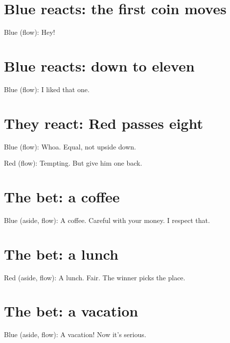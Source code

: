 
\section{Blue reacts: the first coin moves}\label{react:first-move}

Blue (flow): Hey!


\section{Blue reacts: down to eleven}\label{react:blue-reaches-eleven}

Blue (flow): I liked that one.


\section{They react: Red passes eight}\label{react:red-above-eight}

Blue (flow): Whoa. Equal, not upside down.

Red (flow): Tempting. But give him one back.


\section{The bet: a coffee}\label{bet:coffee}

Blue (aside, flow): A coffee. Careful with your money. I respect that.

\section{The bet: a lunch}\label{bet:lunch}

Red (aside, flow): A lunch. Fair. The winner picks the place.

\section{The bet: a vacation}\label{bet:vacation}

Blue (aside, flow): A vacation! Now it's serious.

